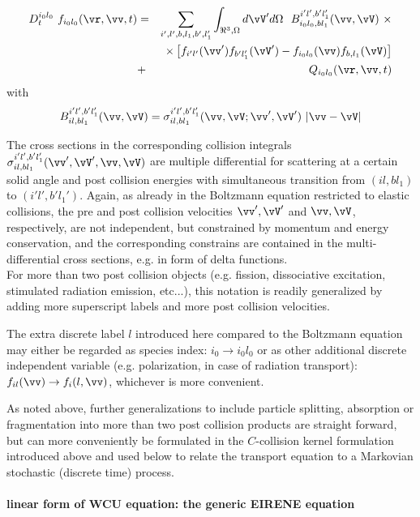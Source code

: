 \begin{eqnarray}\label{WCU}
D_t^{i_0l_0} \ f_{i_0l_0}(\vr,\vv,t)
& = &
\sum_{i',l',b,l_1,b',l_1'}\int_{\Re^3,\Omega}  d\vV'd\Omega \ \
B_{i_0l_0,bl_1}^{i'l',b'l_1'}(\vv,\vV) \ \times \\ && \times
\left[f_{i'l'}(\vv')
f_{b'l_1'}(\vV')- f_{i_0l_0}(\vv) f_{b,l_1}(\vV)\right]
\nonumber \\  &+  & Q_{i_0l_0}(\vr,\vv,t) \nonumber
\end{eqnarray}
with
\begin{equation}
B_{il,bl_1}^{i'l',b'l_1'}(\vv,\vV)=\sigma_{il,bl_1}^{i'l',b'l_1'}(\vv,\vV;\vv',\vV') \
|\vv-\vV|
\end{equation}

The cross sections in the
corresponding collision integrals
$\sigma_{il,bl_1}^{i'l',b'l_1'}(\vv',\vV',\vv,\vV)$
are multiple differential for scattering at a certain solid angle and post
collision energies with simultaneous transition from $(il, bl_1)$
to $(i'l',b'l_1')$.
Again, as already in the Boltzmann equation restricted to elastic collisions, the pre and post collision velocities
$\vv',\vV'$ and $\vv,\vV$, respectively, are not independent, but constrained by momentum and energy conservation, and the corresponding constrains
are contained in the multi-differential cross sections, e.g. in form of delta functions.
\\
For more than two post collision objects (e.g. fission, dissociative excitation, stimulated radiation emission, etc...), this notation is readily generalized by
adding more superscript labels and more post collision velocities.



The extra discrete label $l$ introduced here compared to the Boltzmann equation may either be regarded as species index:
$i_0 \rightarrow i_0l_0$ or as other additional discrete independent variable (e.g. polarization, in case of radiation transport):
$f_{il}(\vv) \rightarrow f_{i}(l,\vv)$, whichever is more convenient.

As noted above, further generalizations to include particle
splitting, absorption or fragmentation into more than two post
collision products are straight forward, but can more conveniently
be formulated in the $C$-collision kernel formulation introduced above and used below to relate the transport equation
to a Markovian stochastic (discrete time) process.

\paragraph {linear form of WCU equation: the generic EIRENE equation}\mbox{}\\


